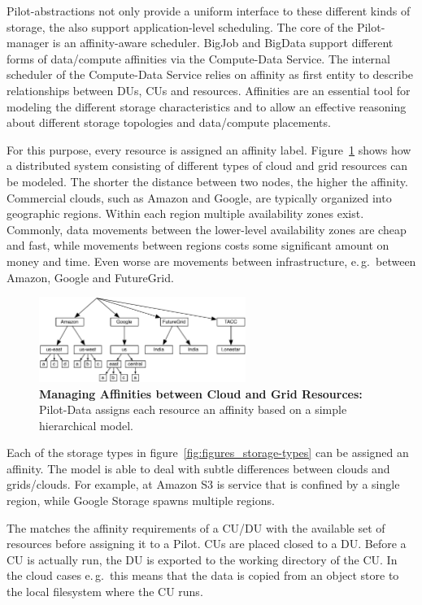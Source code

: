 \documentclass[times]{cpeauth}
\newcommand{\pilot}{Pilot\xspace}
\newcommand{\pilotdata}{Pilot-Data\xspace}
\newcommand{\computedataservice}{Compute-Data Service\xspace}
\newcommand{\du}{DU\xspace}
\newcommand{\dus}{DUs\xspace}
\newcommand{\cu}{CU\xspace}
\newcommand{\cus}{CUs\xspace}
\begin{document}
\pilot-abstractions not only provide a uniform interface to these different
kinds of storage, the also support application-level scheduling. The core of
the \pilot-manager is an affinity-aware scheduler. BigJob and BigData support
different forms of data/compute affinities via the \computedataservice. The
internal scheduler of the \computedataservice relies on affinity as first
entity to describe relationships between \dus, \cus and resources. Affinities
are an essential tool for modeling the different storage characteristics and
to allow an effective reasoning about different storage topologies and
data/compute placements.

For this purpose, every resource is assigned an affinity label.
Figure~\ref{fig:figures_affinities} shows how a distributed system consisting
of different types of cloud and grid resources can be modeled. The shorter the 
distance between two nodes, the higher the affinity. Commercial clouds, such 
as Amazon and Google, are typically organized into geographic regions. Within 
each region multiple availability zones exist. Commonly, data movements 
between the lower-level availability zones are cheap and fast, while movements 
between regions costs some significant amount on money and time. Even worse 
are movements between infrastructure, e.\,g.\ between Amazon, Google and 
FutureGrid.


\begin{figure}[t]
	\centering
		\includegraphics[width=0.6\textwidth]{figures/affinities.pdf}
	\caption{\textbf{Managing Affinities between Cloud and Grid Resources:} \pilotdata assigns each resource an affinity based on a simple hierarchical model.}
	\label{fig:figures_affinities}
\end{figure}

Each of the storage types in figure~\ref{fig:figures_storage-types} can be 
assigned an affinity. The model is able to deal with subtle differences 
between clouds and grids/clouds. For example, at Amazon S3 is service that is 
confined by a single region, while Google Storage spawns multiple regions.

The \computedataservicescheduler matches the affinity requirements of a 
\cu/\du with the available set of resources before assigning it to a \pilot. 
\cus are placed closed to a \du. Before a \cu is actually run, the \du is 
exported to the working directory of the \cu. In the cloud cases e.\,g.\ this 
means that the data is copied from an object store to the local filesystem 
where the \cu runs.
\end{document}
